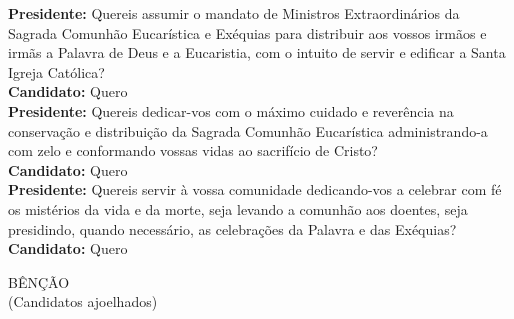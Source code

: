 \documentclass{book}
\begin{document}
\begin{flushleft}
    \textbf{Presidente:} Quereis assumir o mandato de Ministros Extraordinários da Sagrada Comunhão Eucarística e Exéquias para distribuir aos vossos irmãos e irmãs a Palavra de Deus e a Eucaristia, com o intuito de servir e edificar a Santa Igreja Católica?
    \vspace{.1cm} \\
    \textbf{Candidato:} Quero
    \vspace{.1cm} \\
    \textbf{Presidente:} Quereis dedicar-vos com o máximo cuidado e reverência na conservação e distribuição da Sagrada Comunhão Eucarística administrando-a com zelo e conformando vossas vidas ao sacrifício de Cristo?
    \vspace{.1cm} \\
    \textbf{Candidato:} Quero
    \vspace{.1cm} \\
    \textbf{Presidente:} Quereis servir à vossa comunidade dedicando-vos a celebrar com fé os mistérios da vida e da morte, seja levando a comunhão aos doentes, seja presidindo, quando necessário, as celebrações da Palavra e das Exéquias?
    \vspace{.1cm} \\
    \textbf{Candidato:} Quero
    \vspace{.2cm} \\
\end{flushleft}
\begin{center}
    BÊNÇÃO \\
    (Candidatos ajoelhados)
    \vspace{.2cm} \\
\end{center}
\end{document}
